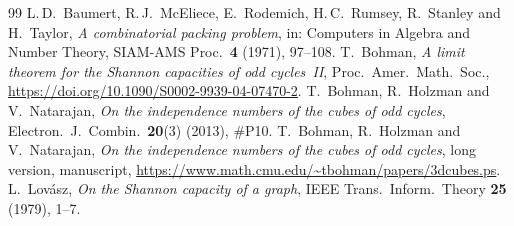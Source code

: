 \documentclass[11pt,colorlinks]{charlie}
\begin{document}
\begin{thebibliography}{99}\small
{} L.\,D.~Baumert, R.\,J.~McEliece, E.~Rodemich, H.\,C.~Rumsey, R.~Stanley and H.~Taylor, \emph{A combinatorial packing problem}, in: Computers in Algebra and Number Theory, SIAM-AMS Proc.\ \textbf{4} (1971), 97--108.
 T.~Bohman, \emph{A limit theorem for the Shannon capacities of odd cycles~II}, Proc.\ Amer.\ Math.\ Soc., \url{https://doi.org/10.1090/S0002-9939-04-07470-2}.
 T.~Bohman, R.~Holzman and V.~Natarajan, \emph{On the independence numbers of the cubes of odd cycles}, Electron.\ J.\ Combin.\ \textbf{20}(3) (2013), \#P10.
 T.~Bohman, R.~Holzman and V.~Natarajan, \emph{On the independence numbers of the cubes of odd cycles}, long version, manuscript, \url{https://www.math.cmu.edu/~tbohman/papers/3dcubes.ps}.
 L.~Lov\'asz, \emph{On the Shannon capacity of a graph}, IEEE Trans.\ Inform.\ Theory \textbf{25} (1979), 1--7.
\end{thebibliography}
\end{document}

